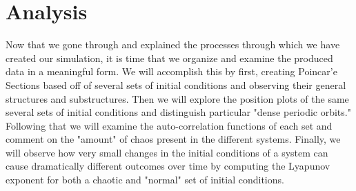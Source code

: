 \documentclass[twocolumn]{article}
\begin{document}
\section{Analysis}
\hspace{\parindent}Now that we gone through and explained the processes through which we have created our simulation, it is time that we organize and examine the produced data in a meaningful form. We will accomplish this by first, creating Poincar'e Sections based off of several sets of initial conditions and observing their general structures and substructures. Then we will explore the position plots of the same several sets of initial conditions and distinguish particular "dense periodic orbits." Following that we will examine the auto-correlation functions of each set and comment on the "amount" of chaos present in the different systems. Finally, we will observe how very small changes in the initial conditions of a system can cause dramatically different outcomes over time by computing the Lyapunov exponent for both a chaotic and "normal" set of initial conditions.
\end{document}

